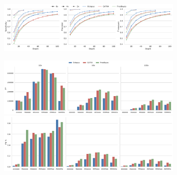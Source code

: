 \documentclass[notitlepage, twocolumn, 10pt]{article}
\begin{document}
\begin{figure}[ht!]
    \centering
\captionsetup[subfigure]{position=top,labelfont=bf,textfont=normalfont,singlelinecheck=off,justification=raggedright}
    \begin{subfigure}[b]{\textwidth}
    	\vspace{-0.8cm}
        \caption{}
        \vspace{-0.5cm}
        \includegraphics[width=\textwidth]{figures/accuracies-by-depth}
        \label{fig:synthetic:accuracy-by-depth}
    \end{subfigure}
    \begin{subfigure}[b]{0.59\textwidth}
        \vspace{-0.5cm}
        \caption{}
        \vspace{-0.5cm}
        \includegraphics[width=\textwidth]{figures/hexaploid_gt_fp_10x_50x_100x}
        \includegraphics[width=\textwidth]{figures/hexaploid_gt_fn_perc_10x_50x_100x}
        \label{fig:synthetic:gt-errors}
    \end{subfigure}
    \begin{subfigure}[b]{0.4\textwidth}
     	\vspace{-0.5cm}
        \caption{}
        \vspace{-0.5cm}

\end{subfigure}
\end{figure}
\end{document}
